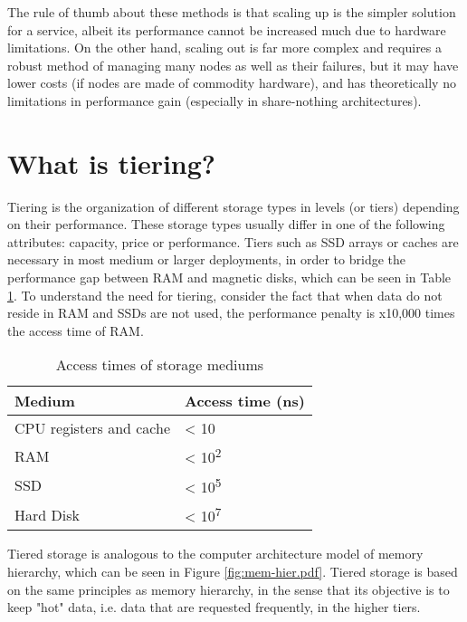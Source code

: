 The rule of thumb about these methods is that scaling up is the simpler 
solution for a service, albeit its performance cannot be increased much due to 
hardware limitations.  On the other hand, scaling out is far more complex and 
requires a robust method of managing many nodes as well as their failures, but 
it may have lower costs (if nodes are made of commodity hardware), and has 
theoretically no limitations in performance gain (especially in share-nothing 
architectures).

\section{What is tiering?}\label{sec:tiering-triad}

Tiering is the organization of different storage types in levels (or tiers) 
depending on their performance.  These storage types usually differ in one of 
the following attributes: capacity, price or performance.  Tiers such as SSD 
arrays or caches are necessary in most medium or larger deployments, in order 
to bridge the performance gap between RAM and magnetic disks, which can be seen 
in Table \ref{tab:gap}. To understand the need for tiering, consider the fact 
that when data do not reside in RAM and SSDs are not used, the performance 
penalty is x10,000 times the access time of RAM.

\begin{table}
	\centering
	\begin{tabular}{ | l | l | }
		\hline
		Medium & Access time (ns) \\ \hline \hline
		CPU registers and cache & < 10 \\ \hline
		RAM & < 10\textsuperscript{2}  \\ \hline
		SSD & < 10\textsuperscript{5} \\ \hline
		Hard Disk & < 10\textsuperscript{7} \\ \hline
	\end{tabular}
	\caption{Access times of storage mediums}
	\label{tab:gap}
\end{table}

Tiered storage is analogous to the computer architecture model of memory 
hierarchy, which can be seen in Figure \ref{fig:mem-hier.pdf}. Tiered storage 
is based on the same principles as memory hierarchy, in the sense that its 
objective is to keep "hot" data, i.e. data that are requested frequently, in 
the higher tiers.


